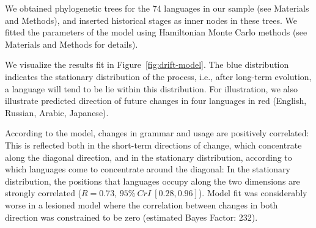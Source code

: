 \documentclass[11pt,a4paper]{article}
\begin{document}
We obtained phylogenetic trees for the 74 languages in our sample (see Materials and Methods), and inserted historical stages as inner nodes in these trees.
We fitted the parameters of the model using Hamiltonian Monte Carlo methods (see Materials and Methods for details).







We visualize the results fit in Figure~\ref{fig:drift-model}.
The blue distribution indicates the stationary distribution of the process, i.e., after long-term evolution, a language will tend to be lie within this distribution.
For illustration, we also illustrate predicted direction of future changes in four languages in red (English, Russian, Arabic, Japanese).

According to the model, changes in grammar and usage are positively correlated:
This is reflected both in the short-term directions of change, which concentrate along the diagonal direction, and in the stationary distribution, according to which languages come to concentrate around the diagonal: In the stationary distribution, the positions that languages occupy along the two dimensions are strongly correlated ($R=0.73$, $95\%\ CrI\ [0.28, 0.96]$).
Model fit was considerably worse in a lesioned model where the correlation between changes in both direction was constrained to be zero (estimated Bayes Factor: 232).
\end{document}
